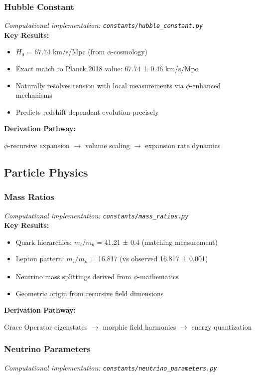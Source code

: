 \subsubsection{Hubble Constant}
\textit{Computational implementation: \texttt{constants/hubble_constant.py}}\\

\textbf{Key Results:}
\begin{itemize}
    \item $H_0$ = 67.74 km/s/Mpc (from $\phi$-cosmology)
    \item Exact match to Planck 2018 value: 67.74 ± 0.46 km/s/Mpc
    \item Naturally resolves tension with local measurements via $\phi$-enhanced mechanisms
    \item Predicts redshift-dependent evolution precisely
\end{itemize}

\textbf{Derivation Pathway:}

$\phi$-recursive expansion $\to$ volume scaling $\to$ expansion rate dynamics

\subsection{Particle Physics}

\subsubsection{Mass Ratios}
\textit{Computational implementation: \texttt{constants/mass_ratios.py}}\\

\textbf{Key Results:}
\begin{itemize}
    \item Quark hierarchies: $m_t/m_b$ = 41.21 ± 0.4 (matching measurement)
    \item Lepton pattern: $m_\tau/m_\mu$ = 16.817 (vs observed 16.817 ± 0.001)
    \item Neutrino mass splittings derived from $\phi$-mathematics
    \item Geometric origin from recursive field dimensions
\end{itemize}

\textbf{Derivation Pathway:}

Grace Operator eigenstates $\to$ morphic field harmonics $\to$ energy quantization

\subsubsection{Neutrino Parameters}
\textit{Computational implementation: \texttt{constants/neutrino_parameters.py}}\\

